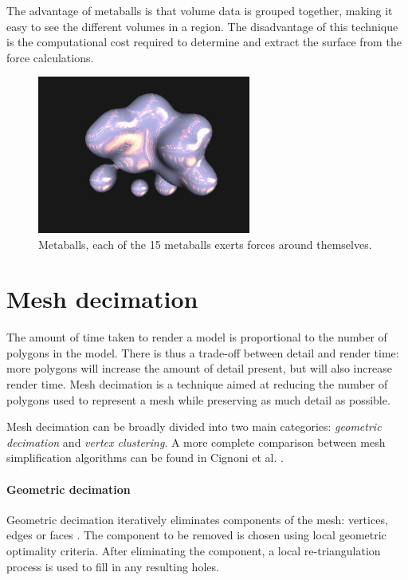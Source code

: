 The advantage of metaballs is that volume data is grouped together, making it
easy to see the different volumes in a region. The disadvantage of this
technique is the computational cost required to determine and extract the
surface from the force calculations.

\begin{figure}
  \begin{center}
    \includegraphics[width=70mm]{metaballs}
  \end{center}
  \caption{Metaballs, each of the 15 metaballs exerts forces around
  themselves.}
  \label{fig:background_metaballs}
\end{figure}



\section{Mesh decimation}
\label{sec:background_decimation}

The amount of time taken to render a model is proportional to the number of
polygons in the model. There is thus a trade-off between detail and render
time: more polygons will increase the amount of detail present, but will also
increase render time. Mesh decimation is a technique aimed at reducing the
number of polygons used to represent a mesh while preserving as much detail as
possible.

Mesh decimation can be broadly divided into two main categories:
\emph{geometric decimation} and \emph{vertex clustering}. A more complete
comparison between mesh simplification algorithms can be found in Cignoni et
al. \citep{cignoni98}.

\paragraph{Geometric decimation}

Geometric decimation iteratively eliminates components of the mesh: vertices,
edges or faces \citep{schroeder92}. The component to be removed is chosen using
local geometric optimality criteria. After eliminating the component, a local
re-triangulation process is used to fill in any resulting holes.

